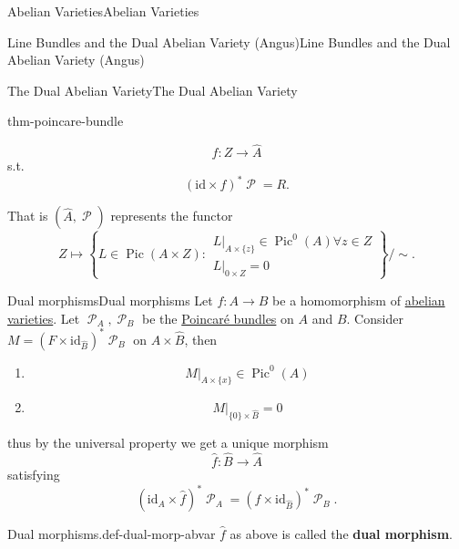 \documentclass[10pt,]{book}
\newcommand{\terminology}[1]{\textbf{#1}}
\numberwithin{equation}{section}
\newcommand{\sheaf}[1]{\operatorname{\mathcal{#1}}}
\newcommand{\id}{\mathrm{id}}
\DeclareMathOperator{\Pic}{Pic}
\begin{document}
\begin{chapterptx}{Abelian Varieties}{}{Abelian Varieties}{}{}
\begin{sectionptx}{Line Bundles and the Dual Abelian Variety (Angus)}{}{Line Bundles and the Dual Abelian Variety (Angus)}{}{}
\begin{subsectionptx}{The Dual Abelian Variety}{}{The Dual Abelian Variety}{}{}
\begin{theorem}{}{}{thm-poincare-bundle}
\begin{enumerate}
\begin{equation*}
f\colon Z\to \hat A
\end{equation*}
s.t.%
\begin{equation*}
(\id\times f)^* \sheaf P = R\text{.}
\end{equation*}
%
\end{enumerate}
That is \((\hat A, \sheaf P)\)  represents the functor%
\begin{equation*}
Z \mapsto \left\{ L\in \Pic (A\times Z) : \substack{ L|_{A\times \{z\}} \in \Pic^0(A) \forall z\in Z \\L|_{ 0 \times Z } = 0}\right\}/\sim\text{.}
\end{equation*}
%
\end{theorem}
\end{subsectionptx}
%
%
\typeout{************************************************}
\typeout{************************************************}
%
\begin{subsectionptx}{Dual morphisms}{}{Dual morphisms}{}{}\label{subsection-24}
\hypertarget{p-195}{}%
Let \(f\colon A\to B\) be a homomorphism of \hyperref[def-buntes-abvar]{abelian varieties}. Let \(\sheaf P_A,\sheaf P_B\) be the \hyperref[thm-poincare-bundle]{Poincaré bundles} on  \(A\) and \(B\). Consider \(M=    (F\times \id_{\hat B})^* \sheaf P_B\) on \(A\times \hat B\), then\leavevmode%
\begin{enumerate}
\item\hypertarget{li-38}{}%
\begin{equation*}
M|_{A\times \{x\}} \in \Pic^0(A)
\end{equation*}
%
\item\hypertarget{li-39}{}%
\begin{equation*}
M|_{\{0\} \times \hat B} = 0
\end{equation*}
%
\end{enumerate}
thus by the universal property we get a unique morphism%
\begin{equation*}
\hat f\colon \hat B \to \hat A
\end{equation*}
satisfying%
\begin{equation*}
(\id_A\times \hat f)^* \sheaf P_A = (f\times \id_{\hat B})^*\sheaf P_B\text{.}
\end{equation*}
%
\begin{definition}{Dual morphisms.}{def-dual-morp-abvar}%
\hypertarget{p-196}{}%
\(\hat f\) as above is called the \terminology{dual morphism}.%
\end{definition}

\end{subsectionptx}
\end{sectionptx}
\end{chapterptx}
\end{document}
